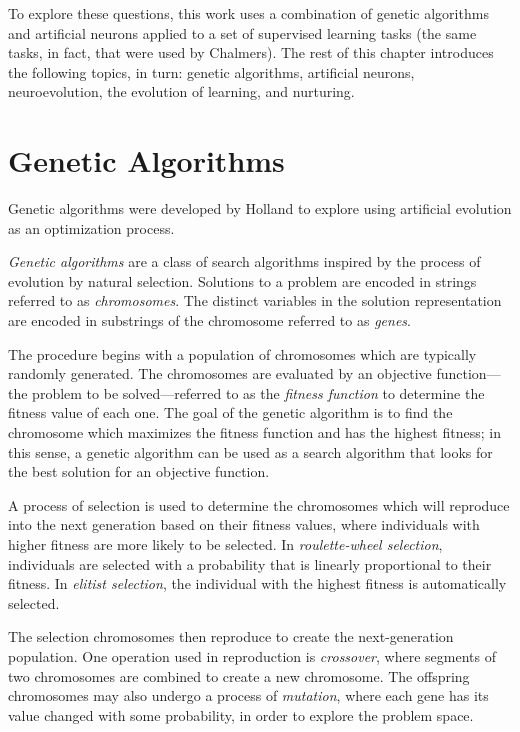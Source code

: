 \documentclass[master]{outhesis}
\begin{document}
To explore these questions, this work uses a combination of genetic algorithms and artificial neurons applied to a set of supervised learning tasks (the same tasks, in fact, that were used by Chalmers). The rest of this chapter introduces the following topics, in turn: genetic algorithms, artificial neurons, neuroevolution, the evolution of learning, and nurturing.

\section{Genetic Algorithms}


Genetic algorithms were developed by Holland \cite{Holland:1975aa} to explore using artificial evolution as an optimization process.

\emph{Genetic algorithms} are a class of search algorithms inspired by the process of evolution by natural selection.
Solutions to a problem are encoded in strings referred to as \emph{chromosomes}.
The distinct variables in the solution representation are encoded in substrings of the chromosome referred to as \emph{genes}.

The procedure begins with a population of chromosomes which are typically randomly generated.
The chromosomes are evaluated by an objective function---the problem to be solved---referred to as the \emph{fitness function} to determine the fitness value of each one.
The goal of the genetic algorithm is to find the chromosome which maximizes the fitness function and has the highest fitness;
in this sense, a genetic algorithm can be used as a search algorithm that looks for the best solution for an objective function.

A process of selection is used to determine the chromosomes which will reproduce into the next generation based on their fitness values,
 where individuals with higher fitness are more likely to be selected.
 In \emph{roulette-wheel selection}, individuals are selected with a probability that is linearly proportional to their fitness.
 In \emph{elitist selection}, the individual with the highest fitness is automatically selected.

The selection chromosomes then reproduce to create the next-generation population.
One operation used in reproduction is \emph{crossover}, where segments of two chromosomes are combined to create a new chromosome.
The offspring chromosomes may also undergo a process of \emph{mutation}, where each gene has its value changed with some probability, in order to explore the problem space. 
\end{document}
